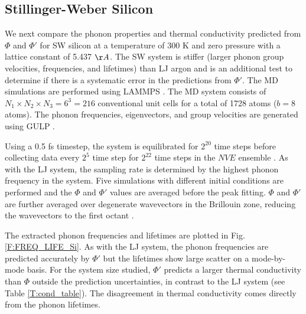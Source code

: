 \vspace*{0mm}
\subsection{\label{S:Subsection_prop_SW}Stillinger-Weber Silicon}
We next compare the phonon properties and thermal conductivity predicted 
from $\Phi$ and $\Phi'$ 
for SW silicon \cite{stillinger_computer_1985} at a temperature of 
$300$ K and zero pressure with a lattice 
constant of 5.437 $\AA$. The SW system is stiffer (larger phonon group 
velocities, frequencies, and 
lifetimes) than LJ argon and is an additional test to determine if there 
is a systematic error in 
the predictions from $\Phi'$. The MD simulations are performed using 
LAMMPS \cite{plimpton_fast_1995}. The MD 
system consists
of $N_1 \times N_2 \times N_3 = 6^3 = 216$ conventional unit cells for a 
total of 1728 atoms 
($b=8$ atoms). The phonon frequencies, eigenvectors, and group velocities 
are generated using 
GULP \cite{gale_general_2003}.

Using a 0.5 fs timestep, the system is equilibrated for $2^{20}$ time 
steps before collecting 
data every $2^5$ time step for $2^{22}$ time steps in the $NVE$ ensemble 
\cite{mcquarrie_statistical_2000}. 
As with the LJ system, the sampling rate is determined by the highest 
phonon frequency in the 
system. Five simulations with different initial conditions are performed 
and the $\Phi$ and $\Phi'$ 
values are averaged before the peak fitting. $\Phi$ and $\Phi'$ are 
further averaged over degenerate 
wavevectors in the Brillouin zone, reducing the wavevectors to the first 
octant \cite{mcgaughey_phonon_2004}.

The extracted phonon frequencies and lifetimes are plotted in Fig$.$ 
\ref{F:FREQ_LIFE_Si}. 
As with the LJ system, the phonon frequencies are predicted accurately 
by $\Phi'$ but the 
lifetimes show large scatter on a mode-by-mode basis. For the system 
size studied, $\Phi'$ 
predicts a larger thermal conductivity than $\Phi$ outside the prediction 
uncertainties, in 
contrast to the LJ system (see Table \ref{T:cond_table}). The disagreement 
in thermal conductivity comes directly from the phonon lifetimes.

